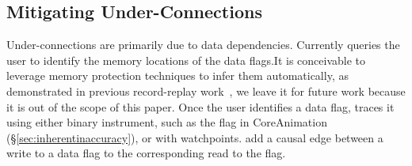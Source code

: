 \subsection{Mitigating Under-Connections}\label{subsec:fix-under}

Under-connections are primarily due to data dependencies.  Currently \xxx
queries the user to identify the memory locations of the data flags.It
is conceivable to leverage memory protection techniques to infer them
automatically, as demonstrated in previous record-replay
work~\cite{xxx}, we leave it for future work because it is out of the
scope of this paper.  Once the user identifies a data flag, \xxx traces it
using either binary instrument, such as the  flag in
CoreAnimation (\S\ref{sec:inherentinaccuracy}), or with watchpoints.  \xxx
add a causal edge between a write to a data flag to the corresponding read
to the flag.
















